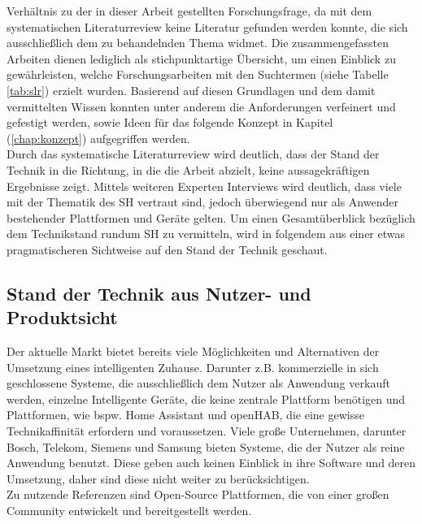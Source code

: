     Verhältnis zu der in dieser Arbeit gestellten Forschungsfrage, da mit dem systematischen Literaturreview keine Literatur 
    gefunden werden konnte, die sich ausschließlich dem zu behandelnden Thema widmet. Die zusammengefassten Arbeiten dienen 
    lediglich als stichpunktartige Übersicht, um einen Einblick zu gewährleisten, welche Forschungsarbeiten mit den 
    Suchtermen (siehe Tabelle \ref{tab:slr}) erzielt wurden. Basierend auf diesen Grundlagen und dem damit vermittelten Wissen 
    konnten unter anderem die Anforderungen verfeinert und gefestigt werden, sowie Ideen für das folgende Konzept in Kapitel 
    (\ref{chap:konzept}) aufgegriffen werden.
    \\ 
    Durch das systematische Literaturreview wird deutlich, dass der Stand der Technik in die Richtung, in die die Arbeit 
    abzielt, keine aussagekräftigen Ergebnisse zeigt. Mittels weiteren Experten Interviews wird deutlich, dass viele mit der 
    Thematik des \acl{SH} vertraut sind, jedoch überwiegend nur als Anwender bestehender Plattformen und Geräte gelten. 
    Um einen Gesamtüberblick bezüglich dem Technikstand rundum \acl{SH} zu vermitteln, 
    wird in folgendem aus einer etwas pragmatischeren Sichtweise auf den Stand der Technik geschaut.
    
    \subsection{Stand der Technik aus Nutzer- und Produktsicht}
        Der aktuelle Markt bietet bereits viele Möglichkeiten und Alternativen der Umsetzung eines intelligenten Zuhause. 
        Darunter z.B. kommerzielle in sich geschlossene Systeme, die ausschließlich dem Nutzer als Anwendung verkauft werden, 
        einzelne Intelligente Geräte, die keine zentrale Plattform benötigen und Plattformen, wie bspw. Home Assistant 
        und openHAB, die eine gewisse Technikaffinität erfordern und voraussetzen. Viele große Unternehmen, darunter Bosch, 
        Telekom, Siemens und Samsung bieten Systeme, die der Nutzer als reine Anwendung benutzt. Diese geben auch keinen 
        Einblick in ihre Software und deren Umsetzung, daher sind diese nicht weiter zu berücksichtigen. 
        \\
        \linebreak
        Zu nutzende Referenzen sind Open-Source Plattformen, die von einer großen Community entwickelt und bereitgestellt werden. 
